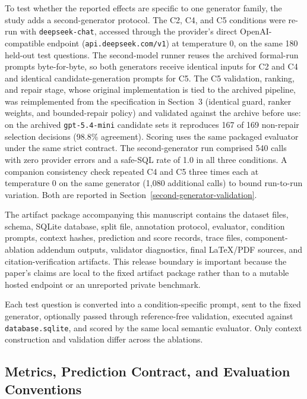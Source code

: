 \documentclass[cmc,article,submit,moreauthors,pdftex]{Definitions/tsp}
\begin{document}
To test whether the reported effects are specific to one generator family, the study adds a second-generator protocol. The C2, C4, and C5 conditions were re-run with \texttt{deepseek-chat}, accessed through the provider's direct OpenAI-compatible endpoint (\texttt{api.deepseek.com/v1}) at temperature 0, on the same 180 held-out test questions. The second-model runner reuses the archived formal-run prompts byte-for-byte, so both generators receive identical inputs for C2 and C4 and identical candidate-generation prompts for C5. The C5 validation, ranking, and repair stage, whose original implementation is tied to the archived pipeline, was reimplemented from the specification in Section~3 (identical guard, ranker weights, and bounded-repair policy) and validated against the archive before use: on the archived \texttt{gpt-5.4-mini} candidate sets it reproduces 167 of 169 non-repair selection decisions (98.8\% agreement). Scoring uses the same packaged evaluator under the same strict contract. The second-generator run comprised 540 calls with zero provider errors and a safe-SQL rate of 1.0 in all three conditions. A companion consistency check repeated C4 and C5 three times each at temperature 0 on the same generator (1,080 additional calls) to bound run-to-run variation. Both are reported in Section~\ref{second-generator-validation}.

The artifact package accompanying this manuscript contains the dataset files, schema, SQLite database, split file, annotation protocol, evaluator, condition prompts, context hashes, prediction and score records, trace files, component-ablation addendum outputs, validator diagnostics, final \LaTeX/PDF sources, and citation-verification artifacts. This release boundary is important because the paper's claims are local to the fixed artifact package rather than to a mutable hosted endpoint or an unreported private benchmark.

Each test question is converted into a condition-specific prompt, sent to the fixed generator, optionally passed through reference-free validation, executed against \texttt{database.sqlite}, and scored by the same local semantic evaluator. Only context construction and validation differ across the ablations.

\subsection{Metrics, Prediction Contract, and Evaluation Conventions}\label{sect:e3}
\end{document}

